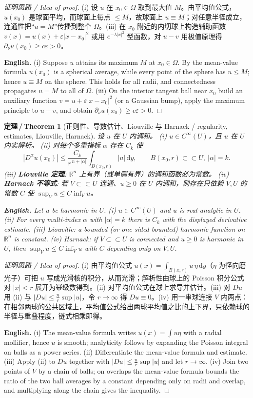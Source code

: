 \documentclass[UTF8,11pt,a4paper]{ctexart}
\newcommand{\EN}[1]{\par\noindent \textbf{English.} #1\par}
\newtheorem{theorem}[definition]{定理\,/\,Theorem}
\newcommand{\R}{\mathbb{R}}
\newcommand{\dd}{\mathrm{d}}
\begin{document}
\begin{proof}[证明思路 / Idea of proof]
(i) 设 $u$ 在 $x_0\in\Omega$ 取到最大值 $M$。由平均值公式，$u(x_0)$ 是球面平均，而球面上每点 $\le M$，故球面上 $u\equiv M$；对任意半径成立，连通性把``$u=M$''传播到整个 $\Omega$。(iii) 在 $x_0$ 附近的内切球上构造辅助函数 $v(x)=u(x)+\varepsilon|x-x_0|^2$ 或用 $e^{-\lambda|x|^2}$ 型函数，对 $u-v$ 用极值原理得 $\partial_\nu u(x_0)\ge c\varepsilon>0$。\EN{(i) Suppose $u$ attains its maximum $M$ at $x_0\in\Omega$. By the mean-value formula $u(x_0)$ is a spherical average, while every point of the sphere has $u\le M$; hence $u\equiv M$ on the sphere. This holds for all radii, and connectedness propagates $u=M$ to all of $\Omega$. (iii) On the interior tangent ball near $x_0$ build an auxiliary function $v=u+\varepsilon|x-x_0|^2$ (or a Gaussian bump), apply the maximum principle to $u-v$, and obtain $\partial_\nu u(x_0)\ge c\varepsilon>0$.}
\end{proof}

\begin{theorem}[正则性、导数估计、Liouville 与 Harnack / regularity, estimates, Liouville, Harnack]\label{thm:lapreg}
设 $u$ 在 $U$ 内调和。
(i) $u\in C^\infty(U)$，且 $u$ 在 $U$ 内实解析。
(ii) 对每个多重指标 $\alpha$ 存在 $C_k$ 使
\[
|D^\alpha u(x_0)|\le\frac{C_k}{r^{\,n+|\alpha|}}\int_{B(x_0,r)}|u|\,\dd y,\qquad B(x_0,r)\subset\subset U,\ |\alpha|=k .
\]
(iii) \textbf{Liouville 定理}: $\R^n$ 上有界（或单侧有界）的调和函数必为常数。
(iv) \textbf{Harnack 不等式}: 若 $V\subset\subset U$ 连通、$u\ge0$ 在 $U$ 内调和，则存在只依赖 $V,U$ 的常数 $C$ 使 $\sup_Vu\le C\inf_Vu$。
\EN{Let $u$ be harmonic in $U$. (i) $u\in C^\infty(U)$ and $u$ is real-analytic in $U$. (ii) For every multi-index $\alpha$ with $|\alpha|=k$ there is $C_k$ with the displayed derivative estimate. (iii) Liouville: a bounded (or one-sided bounded) harmonic function on $\R^n$ is constant. (iv) Harnack: if $V\subset\subset U$ is connected and $u\ge0$ is harmonic in $U$, then $\sup_Vu\le C\inf_Vu$ with $C$ depending only on $V,U$.}
\end{theorem}

\begin{proof}[证明思路 / Idea of proof]
(i) 由平均值公式 $u(x)=\int_{B(x,r)}u\,\eta\,\dd y$（$\eta$ 为径向磨光子）可把 $u$ 写成光滑核的积分，从而光滑；解析性由球上的 Poisson 积分公式对 $|x|<r$ 展开为幂级数得到。(ii) 对平均值公式在球上求导并估计。(iii) 对 $Du$ 用 (ii) 与 $|Du|\le\frac{n}{r}\sup|u|$，令 $r\to\infty$ 得 $Du\equiv0$。(iv) 用一串球连接 $V$ 内两点：在相邻两球的公共区域上，平均值公式给出两球平均值之比的上下界，只依赖球的半径与重叠程度，链式相乘即得。\EN{(i) The mean-value formula writes $u(x)=\int u\eta$ with a radial mollifier, hence $u$ is smooth; analyticity follows by expanding the Poisson integral on balls as a power series. (ii) Differentiate the mean-value formula and estimate. (iii) Apply (ii) to $Du$ together with $|Du|\le\frac nr\sup|u|$ and let $r\to\infty$. (iv) Join two points of $V$ by a chain of balls; on overlaps the mean-value formula bounds the ratio of the two ball averages by a constant depending only on radii and overlap, and multiplying along the chain gives the inequality.}
\end{proof}
\end{document}
